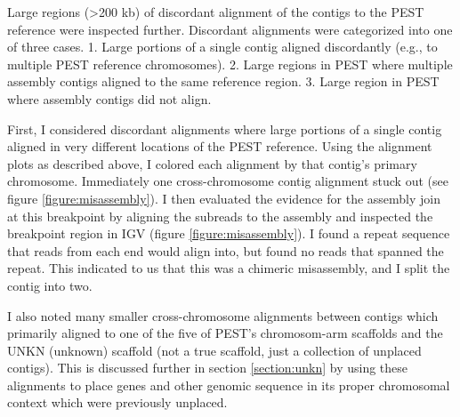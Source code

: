 \par{
Large regions (>200 kb) of discordant alignment of the contigs to the PEST reference were inspected further. Discordant alignments were categorized into one of three cases. 1. Large portions of a single contig aligned discordantly (e.g., to multiple PEST reference chromosomes). 2. Large regions in PEST where multiple assembly contigs aligned to the same reference region.  3. Large region in PEST where assembly contigs did not align. 
} 
\par{
First, I considered discordant alignments where large portions of a single contig aligned in very different locations of the PEST reference. Using the alignment plots as described above, I colored each alignment by that contig's primary chromosome. Immediately one cross-chromosome contig alignment stuck out (see figure \ref{figure:misassembly}). I then evaluated the evidence for the assembly join at this breakpoint by aligning the subreads to the assembly and inspected the breakpoint region in IGV (figure \ref{figure:misassembly}). I found a repeat sequence that reads from each end would align into, but found no reads that spanned the repeat. This indicated to us that this was a chimeric misassembly, and I split the contig into two.
} 
\par{
I also noted many smaller cross-chromosome alignments between contigs which primarily aligned to one of the five of PEST's chromosom-arm scaffolds and the UNKN (unknown) scaffold (not a true scaffold, just a collection of unplaced contigs). This is discussed further in section \ref{section:unkn} by using these alignments to place genes and other genomic sequence in its proper chromosomal context which were previously unplaced.
}

